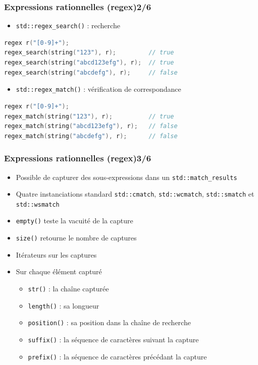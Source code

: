 \documentclass[C++.tex]{subfiles}
\begin{document}
\begin{frame}[fragile]
	\frametitle{Expressions rationnelles (regex)\titlehfill{}2/6}
	\begin{itemize}
		\item\lstinline|std::regex_search()| : recherche
	\end{itemize}

	\begin{lstlisting}[language=C++]
regex r("[0-9]+");
regex_search(string("123"), r);         // true
regex_search(string("abcd123efg"), r);  // true
regex_search(string("abcdefg"), r);     // false\end{lstlisting}

	\begin{itemize}
		\item \lstinline|std::regex_match()| : vérification de correspondance
	\end{itemize}

	\begin{lstlisting}[language=C++]
regex r("[0-9]+");
regex_match(string("123"), r);          // true
regex_match(string("abcd123efg"), r);   // false
regex_match(string("abcdefg"), r);      // false\end{lstlisting}
\end{frame}

\begin{frame}[fragile]
	\frametitle{Expressions rationnelles (regex)\titlehfill{}3/6}
	\begin{itemize}
		\item Possible de capturer des sous-expressions dans un \lstinline|std::match_results|
		\item Quatre instanciations standard \lstinline|std::cmatch|, \lstinline|std::wcmatch|, \lstinline|std::smatch| et \lstinline|std::wsmatch|
		\item \lstinline|empty()| teste la vacuité de la capture
		\item \lstinline|size()| retourne le nombre de captures
		\item Itérateurs sur les captures
		\item Sur chaque élément capturé
		\begin{itemize}
			\item \lstinline|str()| : la chaîne capturée
			\item \lstinline|length()| : sa longueur
			\item \lstinline|position()| : sa position dans la chaîne de recherche
			\item \lstinline|suffix()| : la séquence de caractères suivant la capture
			\item \lstinline|prefix()| : la séquence de caractères précédant la capture
		\end{itemize}
	\end{itemize}
\end{frame}
\end{document}
